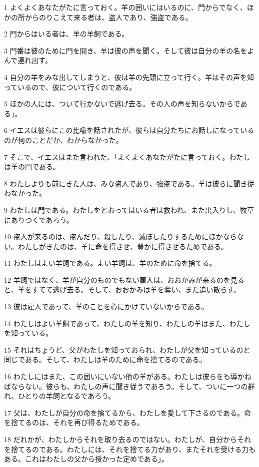 \par 1 よくよくあなたがたに言っておく。羊の囲いにはいるのに、門からでなく、ほかの所からのりこえて来る者は、盗人であり、強盗である。
\par 2 門からはいる者は、羊の羊飼である。
\par 3 門番は彼のために門を開き、羊は彼の声を聞く。そして彼は自分の羊の名をよんで連れ出す。
\par 4 自分の羊をみな出してしまうと、彼は羊の先頭に立って行く。羊はその声を知っているので、彼について行くのである。
\par 5 ほかの人には、ついて行かないで逃げ去る。その人の声を知らないからである」。
\par 6 イエスは彼らにこの比喩を話されたが、彼らは自分たちにお話しになっているのが何のことだか、わからなかった。
\par 7 そこで、イエスはまた言われた、「よくよくあなたがたに言っておく。わたしは羊の門である。
\par 8 わたしよりも前にきた人は、みな盗人であり、強盗である。羊は彼らに聞き従わなかった。
\par 9 わたしは門である。わたしをとおってはいる者は救われ、また出入りし、牧草にありつくであろう。
\par 10 盗人が来るのは、盗んだり、殺したり、滅ぼしたりするためにほかならない。わたしがきたのは、羊に命を得させ、豊かに得させるためである。
\par 11 わたしはよい羊飼である。よい羊飼は、羊のために命を捨てる。
\par 12 羊飼ではなく、羊が自分のものでもない雇人は、おおかみが来るのを見ると、羊をすてて逃げ去る。そして、おおかみは羊を奪い、また追い散らす。
\par 13 彼は雇人であって、羊のことを心にかけていないからである。
\par 14 わたしはよい羊飼であって、わたしの羊を知り、わたしの羊はまた、わたしを知っている。
\par 15 それはちょうど、父がわたしを知っておられ、わたしが父を知っているのと同じである。そして、わたしは羊のために命を捨てるのである。
\par 16 わたしにはまた、この囲いにいない他の羊がある。わたしは彼らをも導かねばならない。彼らも、わたしの声に聞き従うであろう。そして、ついに一つの群れ、ひとりの羊飼となるであろう。
\par 17 父は、わたしが自分の命を捨てるから、わたしを愛して下さるのである。命を捨てるのは、それを再び得るためである。
\par 18 だれかが、わたしからそれを取り去るのではない。わたしが、自分からそれを捨てるのである。わたしには、それを捨てる力があり、またそれを受ける力もある。これはわたしの父から授かった定めである」。
